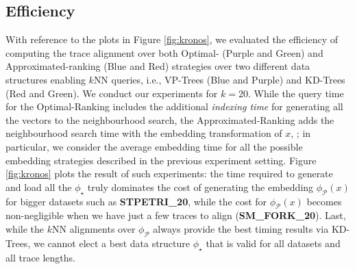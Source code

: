 \subsection{Efficiency}\label{subsec:efficio}
With reference to the plots in Figure \ref{fig:kronos},
we evaluated the efficiency of computing the trace alignment over both Optimal- ({\color{ggplotPurple}Purple} and {\color{ggplotGreen}Green}) and Approximated-ranking ({\color{ggplotBlue}Blue} and {\color{ggplotRed}Red}) strategies over two different data structures enabling $k$NN queries, i.e., VP-Trees ({\color{ggplotBlue}Blue} and {\color{ggplotPurple}Purple}) and KD-Trees ({\color{ggplotRed}Red} and {\color{ggplotGreen}Green}). We conduct our experiments for $k=20$. While the query time for the Optimal-Ranking  includes the additional \textit{indexing time} for generating all the vectors to the neighbourhood search, the Approximated-Ranking  adds the neighbourhood search time with the embedding transformation of $x$, ; in particular, we consider the average embedding time for all the possible embedding strategies described in the previous experiment setting. Figure \ref{fig:kronos} plots the result of such experiments: the time required to generate and load all the $\phi_\star$ truly dominates the cost of generating the embedding $\phi_{\mathcal{P}}(x)$ for bigger datasets such as \textbf{STPETRI\_20}, while the cost for $\phi_{\mathcal{P}}(x)$ becomes non-negligible when we have just a few traces to align (\textbf{SM\_FORK\_20}). Last, while the $k$NN alignments over $\phi_{\mathcal{P}}$ always provide the best timing results via KD-Trees, we cannot elect a best data structure $\phi_\star$ that is valid for all datasets and all trace lengths. 